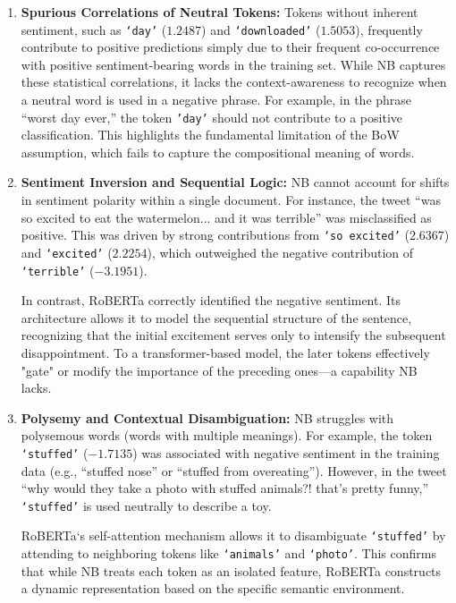 \documentclass[11pt]{article}
\begin{document}
\begin{enumerate}
    \item \textbf{Spurious Correlations of Neutral Tokens:} 
    Tokens without inherent sentiment, such as \texttt{`day'} ($1.2487$) and \texttt{`downloaded'} ($1.5053$), frequently contribute to positive predictions simply due to their frequent co-occurrence with positive sentiment-bearing words in the training set. While NB captures these statistical correlations, it lacks the context-awareness to recognize when a neutral word is used in a negative phrase. For example, in the phrase ``worst day ever,'' the token \texttt{'day'} should not contribute to a positive classification. This highlights the fundamental limitation of the BoW assumption, which fails to capture the compositional meaning of words.

    \item \textbf{Sentiment Inversion and Sequential Logic:} 
    NB cannot account for shifts in sentiment polarity within a single document. For instance, the tweet ``was so excited to eat the watermelon... and it was terrible'' was misclassified as positive. This was driven by strong contributions from \texttt{`so excited'} ($2.6367$) and \texttt{`excited'} ($2.2254$), which outweighed the negative contribution of \texttt{`terrible'} ($-3.1951$). 
    
    In contrast, RoBERTa correctly identified the negative sentiment. Its architecture allows it to model the sequential structure of the sentence, recognizing that the initial excitement serves only to intensify the subsequent disappointment. To a transformer-based model, the later tokens effectively "gate" or modify the importance of the preceding ones—a capability NB lacks.

    \item \textbf{Polysemy and Contextual Disambiguation:} 
    NB struggles with polysemous words (words with multiple meanings). For example, the token \texttt{`stuffed'} ($-1.7135$) was associated with negative sentiment in the training data (e.g., ``stuffed nose'' or ``stuffed from overeating''). However, in the tweet ``why would they take a photo with stuffed animals?! that's pretty funny,'' \texttt{`stuffed'} is used neutrally to describe a toy. 
    
    RoBERTa`s self-attention mechanism allows it to disambiguate \texttt{`stuffed'} by attending to neighboring tokens like \texttt{`animals'} and \texttt{`photo'}. This confirms that while NB treats each token as an isolated feature, RoBERTa constructs a dynamic representation based on the specific semantic environment.


\end{enumerate}
\end{document}
